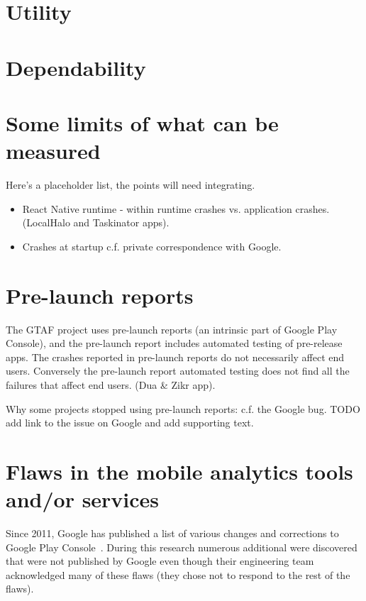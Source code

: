\section{Utility}


\section{Dependability}



\section{Some limits of what can be measured}

Here's a placeholder list, the points will need integrating.
\begin{itemize}
    \item React Native runtime - within runtime crashes vs. application crashes. (LocalHalo and Taskinator apps).
    \item Crashes at startup c.f. private correspondence with Google.
\end{itemize}

\section{Pre-launch reports}
The GTAF project uses pre-launch reports (an intrinsic part of Google Play Console), and the pre-launch report includes automated testing of pre-release apps. The crashes reported in pre-launch reports do not necessarily affect end users. Conversely the pre-launch report automated testing does not find all the failures that affect end users. (Dua \& Zikr app).

Why some projects stopped using pre-launch reports: c.f. the Google bug. TODO add link to the issue on Google and add supporting text.

\section{Flaws in the mobile analytics tools and/or services}

Since 2011, Google has published a list of various changes and corrections to Google Play Console~\citep{google_play_troubleshoot_app_statistics_problems}. During this research numerous additional were discovered that were not published by Google even though their engineering team acknowledged many of these flaws (they chose not to respond to the rest of the flaws). 

